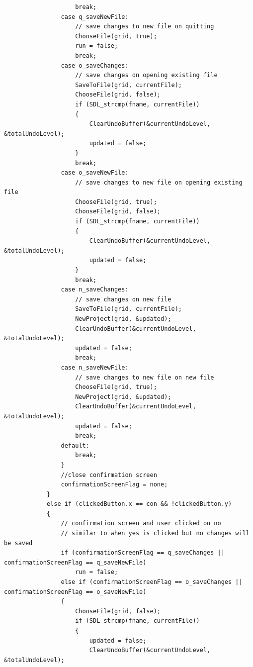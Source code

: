 \documentclass[report]{subfiles}
\begin{document}
\begin{lstlisting}
                    break;
                case q_saveNewFile:
                    // save changes to new file on quitting
                    ChooseFile(grid, true);
                    run = false;
                    break;
                case o_saveChanges:
                    // save changes on opening existing file
                    SaveToFile(grid, currentFile);
                    ChooseFile(grid, false);
                    if (SDL_strcmp(fname, currentFile))
                    {
                        ClearUndoBuffer(&currentUndoLevel, &totalUndoLevel);
                        updated = false;
                    }
                    break;
                case o_saveNewFile:
                    // save changes to new file on opening existing file
                    ChooseFile(grid, true);
                    ChooseFile(grid, false);
                    if (SDL_strcmp(fname, currentFile))
                    {
                        ClearUndoBuffer(&currentUndoLevel, &totalUndoLevel);
                        updated = false;
                    }
                    break;
                case n_saveChanges:
                    // save changes on new file
                    SaveToFile(grid, currentFile);
                    NewProject(grid, &updated);
                    ClearUndoBuffer(&currentUndoLevel, &totalUndoLevel);
                    updated = false;
                    break;
                case n_saveNewFile:
                    // save changes to new file on new file
                    ChooseFile(grid, true);
                    NewProject(grid, &updated);
                    ClearUndoBuffer(&currentUndoLevel, &totalUndoLevel);
                    updated = false;
                    break;
                default:
                    break;
                }
                //close confirmation screen
                confirmationScreenFlag = none;
            }
            else if (clickedButton.x == con && !clickedButton.y)
            {
                // confirmation screen and user clicked on no
                // similar to when yes is clicked but no changes will be saved
                if (confirmationScreenFlag == q_saveChanges || confirmationScreenFlag == q_saveNewFile)
                    run = false;
                else if (confirmationScreenFlag == o_saveChanges || confirmationScreenFlag == o_saveNewFile)
                {
                    ChooseFile(grid, false);
                    if (SDL_strcmp(fname, currentFile))
                    {
                        updated = false;
                        ClearUndoBuffer(&currentUndoLevel, &totalUndoLevel);

\end{lstlisting}
\end{document}
